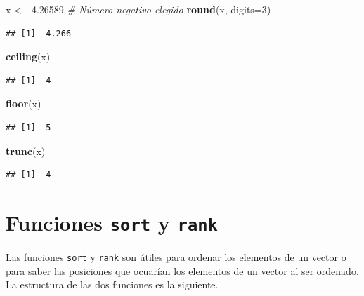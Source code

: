 \documentclass[10pt,]{krantz}
\makeatletter
\newenvironment{Shaded}{\begin{snugshade}}{\end{snugshade}}
\newcommand{\KeywordTok}[1]{\textcolor[rgb]{0.13,0.29,0.53}{\textbf{{#1}}}}
\newcommand{\DataTypeTok}[1]{\textcolor[rgb]{0.13,0.29,0.53}{{#1}}}
\newcommand{\DecValTok}[1]{\textcolor[rgb]{0.00,0.00,0.81}{{#1}}}
\newcommand{\FloatTok}[1]{\textcolor[rgb]{0.00,0.00,0.81}{{#1}}}
\newcommand{\StringTok}[1]{\textcolor[rgb]{0.31,0.60,0.02}{{#1}}}
\newcommand{\CommentTok}[1]{\textcolor[rgb]{0.56,0.35,0.01}{\textit{{#1}}}}
\newcommand{\NormalTok}[1]{{#1}}
\newenvironment{kframe}{%
\medskip{}
\setlength{\fboxsep}{.8em}
 \def\at@end@of@kframe{}%
 \ifinner\ifhmode%
  \def\at@end@of@kframe{\end{minipage}}%
  \begin{minipage}{\columnwidth}%
 \fi\fi%
 \def\FrameCommand##1{\hskip\@totalleftmargin \hskip-\fboxsep
 \colorbox{shadecolor}{##1}\hskip-\fboxsep
     \hskip-\linewidth \hskip-\@totalleftmargin \hskip\columnwidth}%
 \MakeFramed {\advance\hsize-\width
   \@totalleftmargin\z@ \linewidth\hsize
   \@setminipage}}%
 {\par\unskip\endMakeFramed%
 \at@end@of@kframe}
\renewenvironment{Shaded}{\begin{kframe}}{\end{kframe}}
\makeatother
\begin{document}
\begin{Shaded}
\begin{Highlighting}[]
\NormalTok{x <-}\StringTok{ }\NormalTok{-}\FloatTok{4.26589}  \CommentTok{# Número negativo elegido}
\KeywordTok{round}\NormalTok{(x, }\DataTypeTok{digits=}\DecValTok{3}\NormalTok{)}
\end{Highlighting}
\end{Shaded}

\begin{verbatim}
## [1] -4.266
\end{verbatim}

\begin{Shaded}
\begin{Highlighting}[]
\KeywordTok{ceiling}\NormalTok{(x)}
\end{Highlighting}
\end{Shaded}

\begin{verbatim}
## [1] -4
\end{verbatim}

\begin{Shaded}
\begin{Highlighting}[]
\KeywordTok{floor}\NormalTok{(x)}
\end{Highlighting}
\end{Shaded}

\begin{verbatim}
## [1] -5
\end{verbatim}

\begin{Shaded}
\begin{Highlighting}[]
\KeywordTok{trunc}\NormalTok{(x)}
\end{Highlighting}
\end{Shaded}

\begin{verbatim}
## [1] -4
\end{verbatim}

\section{\texorpdfstring{Funciones \texttt{sort} y \texttt{rank}
  
}{Funciones sort y rank    }}\label{funciones-sort-y-rank}

Las funciones \texttt{sort} y \texttt{rank} son útiles para ordenar los
elementos de un vector o para saber las posiciones que ocuarían los
elementos de un vector al ser ordenado. La estructura de las dos
funciones es la siguiente.
\end{document}

